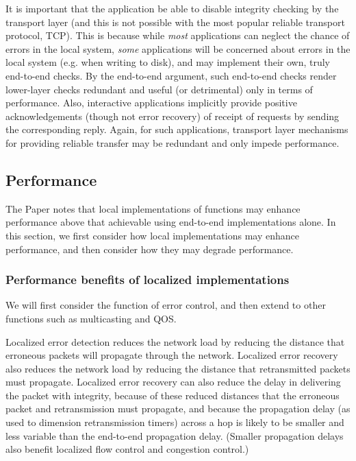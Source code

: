 \documentclass[a4paper,11pt,notitlepage,twoside,openright]{article}
\begin{document}
It is important that the application be able to disable integrity
checking by the transport layer (and this is not possible with the most
popular reliable transport protocol, TCP). This is because while
\emph{most} applications can neglect the chance of errors in the local
system, \emph{some} applications will be concerned about errors in the
local system (e.g. when writing to disk), and may implement their own,
truly end-to-end checks. By the end-to-end argument, such end-to-end
checks render lower-layer checks redundant and useful (or detrimental)
only in terms of performance. Also, interactive applications implicitly
provide positive acknowledgements (though not error recovery) of receipt
of requests by sending the corresponding reply. Again, for such
applications, transport layer mechanisms for providing reliable transfer
may be redundant and only impede performance.

\hypertarget{performance}{%
\subsection{Performance}\label{performance}}

The Paper notes that local implementations of functions may enhance
performance above that achievable using end-to-end implementations
alone. In this section, we first consider how local implementations may
enhance performance, and then consider how they may degrade performance.

\hypertarget{performance-benefits-of-localized-implementations}{%
\subsubsection{Performance benefits of localized implementations
}\label{performance-benefits-of-localized-implementations}}

We will first consider the function of error control, and then extend to
other functions such as multicasting and QOS.

Localized error detection reduces the network load by reducing the
distance that erroneous packets will propagate through the network.
Localized error recovery also reduces the network load by reducing the
distance that retransmitted packets must propagate. Localized error
recovery can also reduce the delay in delivering the packet with
integrity, because of these reduced distances that the erroneous packet
and retransmission must propagate, and because the propagation delay (as
used to dimension retransmission timers) across a hop is likely to be
smaller and less variable than the end-to-end propagation delay.
(Smaller propagation delays also benefit localized flow control and
congestion control.)
\end{document}
